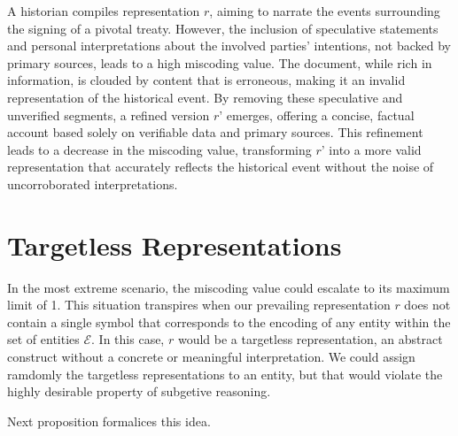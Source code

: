 \begin{example}
A historian compiles representation $r$, aiming to narrate the events surrounding the signing of a pivotal treaty. However, the inclusion of speculative statements and personal interpretations about the involved parties’ intentions, not backed by primary sources, leads to a high miscoding value. The document, while rich in information, is clouded by content that is erroneous, making it an invalid representation of the historical event. By removing these speculative and unverified segments, a refined version $r’$ emerges, offering a concise, factual account based solely on verifiable data and primary sources. This refinement leads to a decrease in the miscoding value, transforming $r’$ into a more valid representation that accurately reflects the historical event without the noise of uncorroborated interpretations.
\end{example}

%
%

\section{Targetless Representations}
\label{sec:targetless_representations}

In the most extreme scenario, the miscoding value could escalate to its maximum limit of 1. This situation transpires when our prevailing representation $r$ does not contain a single symbol that corresponds to the encoding of any entity within the set of entities $\mathcal{E}$. In this case, $r$ would be a targetless representation, an abstract construct without a concrete or meaningful interpretation. We could assign ramdomly the targetless representations to an entity, but that would violate the highly desirable property of subgetive reasoning.

Next proposition formalices this idea.

